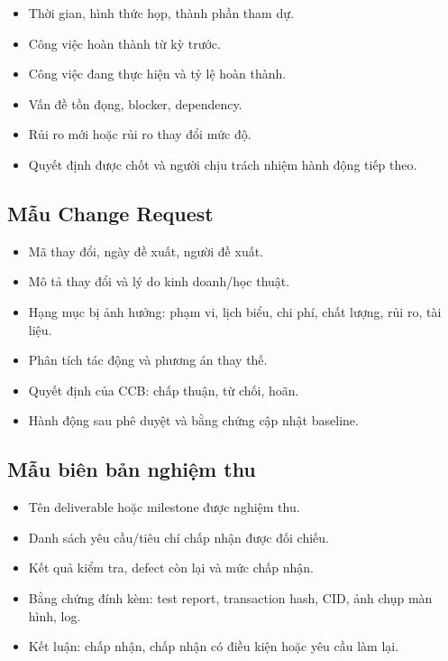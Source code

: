 \begin{itemize}
  \item Thời gian, hình thức họp, thành phần tham dự.
  \item Công việc hoàn thành từ kỳ trước.
  \item Công việc đang thực hiện và tỷ lệ hoàn thành.
  \item Vấn đề tồn đọng, blocker, dependency.
  \item Rủi ro mới hoặc rủi ro thay đổi mức độ.
  \item Quyết định được chốt và người chịu trách nhiệm hành động tiếp theo.
\end{itemize}

\subsection{Mẫu Change Request}

\begin{itemize}
  \item Mã thay đổi, ngày đề xuất, người đề xuất.
  \item Mô tả thay đổi và lý do kinh doanh/học thuật.
  \item Hạng mục bị ảnh hưởng: phạm vi, lịch biểu, chi phí, chất lượng, rủi ro, tài liệu.
  \item Phân tích tác động và phương án thay thế.
  \item Quyết định của CCB: chấp thuận, từ chối, hoãn.
  \item Hành động sau phê duyệt và bằng chứng cập nhật baseline.
\end{itemize}

\subsection{Mẫu biên bản nghiệm thu}

\begin{itemize}
  \item Tên deliverable hoặc milestone được nghiệm thu.
  \item Danh sách yêu cầu/tiêu chí chấp nhận được đối chiếu.
  \item Kết quả kiểm tra, defect còn lại và mức chấp nhận.
  \item Bằng chứng đính kèm: test report, transaction hash, CID, ảnh chụp màn hình, log.
  \item Kết luận: chấp nhận, chấp nhận có điều kiện hoặc yêu cầu làm lại.
\end{itemize}

